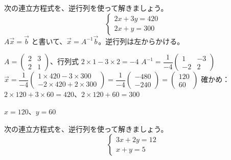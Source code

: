 \begin{reidai}[逆行列で連立方程式を解く]
次の連立方程式を、逆行列を使って解きましょう。
\[ \begin{cases}2x+3y=420\\2x+y=300\end{cases} \]
\kangaekata $A\vec x=\vec b$ と書いて、$\vec x=A^{-1}\vec b$。逆行列は左からかける。\par
\shiki $A=\begin{pmatrix}2&3\\2&1\end{pmatrix}$、行列式 $2\times1-3\times2=-4$\kviifq
$A^{-1}=\dfrac{1}{-4}\begin{pmatrix}1&-3\\-2&2\end{pmatrix}$\kviifq
$\vec x=\dfrac{1}{-4}\begin{pmatrix}1\times420-3\times300\\-2\times420+2\times300\end{pmatrix}=\dfrac{1}{-4}\begin{pmatrix}-480\\-240\end{pmatrix}=\begin{pmatrix}120\\60\end{pmatrix}$\kviifq
確かめ：$2\times120+3\times60=420$、$2\times120+60=300$\par
\kotae $x=120$、$y=60$
\end{reidai}

\begin{jibun}
次の連立方程式を、逆行列を使って解きましょう。
\[ \begin{cases}3x+2y=12\\x+y=5\end{cases} \]
\end{jibun}

